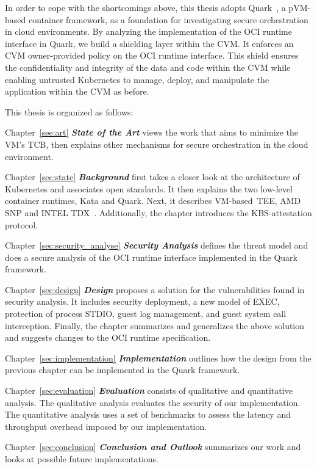 In order to cope with the shortcomings above, this thesis adopts Quark~\cite*{quark}, a \acrshort{pVM}-based container framework, as a foundation for investigating secure orchestration in cloud environments. By analyzing the implementation of the OCI runtime interface in Quark, we build a 
shielding layer within the \acrshort{CVM}. It enforces an \acrshort{CVM} owner-provided policy on the OCI runtime interface. This shield ensures the confidentiality and integrity of the data and code within the \acrshort{CVM} while enabling untrusted Kubernetes to manage, deploy, and manipulate the application within the \acrshort{CVM} as before.
 
This thesis is organized as follows:

\begin{hangparas}{.25in}{1} 

Chapter~\ref{see:art} \textit{\textbf{State of the Art}} views the work that aims to minimize the VM's TCB, then explains other mechanisms for secure orchestration in the cloud environment. 

Chapter~\ref{sec:state} \textit{\textbf{Background}} first takes a closer look at the architecture of Kubernetes\cite*{k8s} and associates open standards. It then explains the two low-level container runtimes, Kata and Quark. Next, it describes VM-based~\acrshort{TEE}, AMD SNP\cite*{SEV_SNP_white_book} and INTEL TDX~\cite*{Intel_tdx_whitepaper}. Additionally, the chapter 
introduces the KBS-attestation protocol.

Chapter~\ref{sec:security_analyse} \textit{\textbf{Security Analysis}} defines the threat model and does a secure analysis of the OCI runtime interface implemented in the Quark framework.

Chapter~\ref{sec:design} \textit{\textbf{Design}} proposes a solution for the vulnerabilities found in security analysis. It includes security deployment, a new model of EXEC, protection of process STDIO, guest log management, and guest system call interception. Finally, the chapter summarizes and generalizes the above solution and suggests changes to the OCI runtime specification.

Chapter~\ref{sec:implementation} \textit{\textbf{Implementation}} outlines how the design from the previous chapter can be implemented in the Quark framework.

Chapter~\ref{sec:evaluation} \textit{\textbf{Evaluation}} consists of qualitative and quantitative analysis. The qualitative analysis evaluates the security of our implementation. The quantitative analysis uses a set of benchmarks to assess the latency and throughput overhead imposed by our implementation.

Chapter~\ref{sec:conclusion} \textit{\textbf{Conclusion and Outlook}} summarizes our work and looks at possible future implementations.

\end{hangparas}

\cleardoublepage


